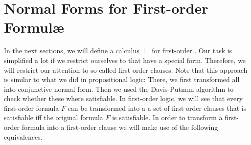 \section{Normal Forms for First-order Formul\ae}
In the next sections, we will define a calculus $\vdash$ for first-order \formulae.
Our task  is simplified a lot if we restrict ourselves to \formulae that have a special form.
Therefore, we will restrict our attention to so called first-order clauses.  Note that
this approach is similar to what we did in propositional logic:  There, we first
transformed all \formulae into conjunctive normal form.  Then we used the Davis-Putnam
algorithm to check whether these \formulae where satisfiable.
In first-order logic, we will see that every first-order formula $F$ can be transformed into a a set of first
order clauses that is satisfiable iff the original formula $F$ is satisfiable.
In order to transform a first-order formula into a first-order clause we will make use of
the following equivalences.

